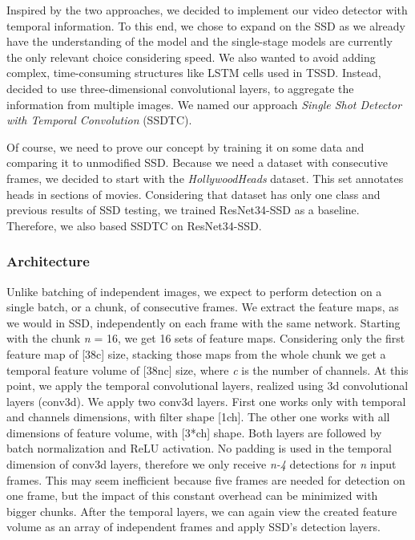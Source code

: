 Inspired by the two approaches, we decided to implement our video detector with temporal information. To this end, we chose to expand on the SSD as we already have the understanding of the model and the single-stage models are currently the only relevant choice considering speed. We also wanted to avoid adding complex, time-consuming structures like LSTM cells used in TSSD. Instead, decided to use three-dimensional convolutional layers, to aggregate the information from multiple images. We named our approach \textit{Single Shot Detector with Temporal Convolution} (SSDTC).

Of course, we need to prove our concept by training it on some data and comparing it to unmodified SSD. Because we need a dataset with consecutive frames, we decided to start with the \textit{HollywoodHeads} dataset. This set annotates heads in sections of movies. Considering that dataset has only one class and previous results of SSD testing, we trained ResNet34-SSD as a baseline. Therefore, we also based SSDTC on ResNet34-SSD.

\subsubsection{Architecture}
Unlike batching of independent images, we expect to perform detection on a single batch, or a chunk, of consecutive frames. We extract the feature maps, as we would in SSD, independently on each frame with the same network. Starting with the chunk \textit{n} = 16, we get 16 sets of feature maps. Considering only the first feature map of [38\x c] size, stacking those maps from the whole chunk we get a temporal feature volume of [38\x n\x c] size, where \textit{c} is the number of channels. At this point, we apply the temporal convolutional layers, realized using 3d convolutional layers (conv3d). We apply two conv3d layers. First one works only with temporal and channels dimensions, with filter shape [1\x ch].  The other one works with all dimensions of feature volume, with [3*ch] shape. Both layers are followed by batch normalization and ReLU activation. No padding is used in the temporal dimension of conv3d layers, therefore we only receive \textit{n-4} detections for \textit{n} input frames. This may seem inefficient because five frames are needed for detection on one frame, but the impact of this constant overhead can be minimized with bigger chunks. After the temporal layers, we can again view the created feature volume as an array of independent frames and apply SSD's detection layers. 

